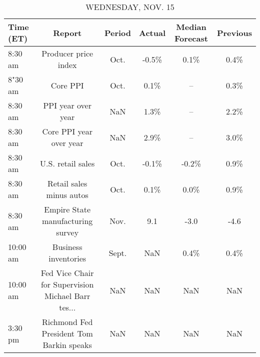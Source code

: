 \documentclass{article}%
\begin{document}
%


\begin{table}[htbp]%
\caption{WEDNESDAY, NOV. 15}%
\centering%
\begin{adjustbox}{width=1\textwidth}%
\begin{tabular}{lccccc}
\toprule
Time (ET) &                                             Report & Period & Actual & Median Forecast & Previous \\
\midrule
  8:30 am &                               Producer price index &   Oct. &  -0.5\% &            0.1\% &     0.4\% \\
  8"30 am &                                           Core PPI &   Oct. &   0.1\% &              -- &     0.3\% \\
  8:30 am &                                 PPI year over year &    NaN &   1.3\% &              -- &     2.2\% \\
  8:30 am &                            Core PPI year over year &    NaN &   2.9\% &              -- &     3.0\% \\
  8:30 am &                                  U.S. retail sales &   Oct. &  -0.1\% &           -0.2\% &     0.9\% \\
  8:30 am &                           Retail sales minus autos &   Oct. &   0.1\% &            0.0\% &     0.9\% \\
  8:30 am &                  Empire State manufacturing survey &   Nov. &    9.1 &            -3.0 &     -4.6 \\
 10:00 am &                               Business inventories &  Sept. &    NaN &            0.4\% &     0.4\% \\
 10:00 am & Fed Vice Chair for Supervision Michael Barr tes... &    NaN &    NaN &             NaN &      NaN \\
  3:30 pm &           Richmond Fed President Tom Barkin speaks &    NaN &    NaN &             NaN &      NaN \\
\bottomrule
\end{tabular}
%
\end{adjustbox}%
\end{table}

%
\end{document}
